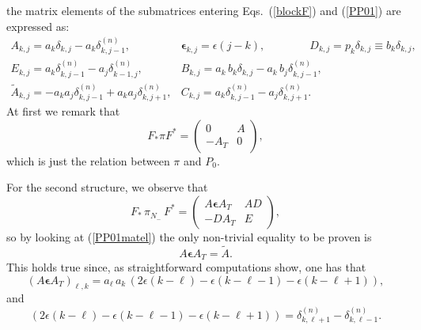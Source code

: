 \documentclass[12pt]{article}
\newcommand{\den}[2]{{{\delta^{(n)}_{#1,#2}}}}
\begin{document}
the matrix elements of the submatrices entering Eqs.\ (\ref{blockF}) and (\ref{PP01}) are expressed as:
\begin{equation}
\label{PP01matel}
\begin{array}{ll}
A_{k,j} =a_k\delta_{k,j}-a_k\den{k}{j-1} , &\boldsymbol{\epsilon}_{k,j}=\epsilon(j-k),\qquad \qquad  {D}_{k,j}=p_k\delta_{k,j}\equiv b_k \delta_{k,j},\\
E_{k,j}=a_k\den{k}{j-1}-a_j\den{k-1}{j},  & B_{k,j}=a_k\, b_k\delta_{k,j}-a_k\, b_j \delta^{(n)}_{k,j-1},\\
 \widetilde{A}_{k,j}=-a_ka_j\den{k}{j-1}+a_ka_j\den{k}{j+1},  & C_{k,j}=a_k\den{k}{j-1}-a_j\den{k}{j+1}.
\end{array}
\end{equation}
At first we remark that 
\begin{equation}\label{FP0ok}
F_*\pi F^*=\left( \begin {array}{c|c} 
0 & A\\ 
\hline
-A_T & 0
\end {array} \right), 
\end{equation}
which is just the relation between $\pi$ and $P_0$.

For the second structure, we observe that 
\begin{equation}\label{checkP1} 
F_*\,\pi_{N_-}^{\phantom{\sharp}}\, F^*=\left( \begin {array}{c|c} 
A\boldsymbol{\epsilon} A_T & AD\\ 
\hline
-DA_T & E
\end {array} \right),
\end{equation}
so by looking at (\ref{PP01matel}) the only non-trivial equality to be proven is
\begin{equation}
\label{nteqapp}
A\boldsymbol{\epsilon}A_T=\widetilde{A}.
\end{equation}
This holds true since, as straightforward computations show, one has that
\begin{equation}
\label{conto1}
\left(A\boldsymbol{\epsilon}A_T\right)_{\ell,k}=a_\ell\, a_k\, \left(2\epsilon(k-\ell)-\epsilon(k-\ell-1)-\epsilon(k-\ell+1)\right),
\end{equation}
and
\begin{equation}
\label{conto2}
\left(2\epsilon(k-\ell)-\epsilon(k-\ell-1)-\epsilon(k-\ell+1)\right)=\den{k}{\ell+1}-\den{k}{\ell-1}.
\end{equation}
\end{document}

